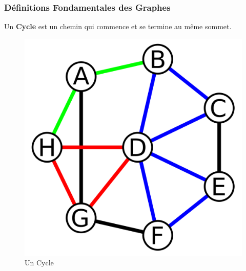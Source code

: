 \begin{frame}
\frametitle{Définitions Fondamentales des Graphes}

\begin{tcolorbox}[colback=orange!10,colframe=orange!100!black,
    title=Un Cycle]
    Un \textbf{Cycle} est un chemin qui commence et se termine au même sommet.
\end{tcolorbox}

\begin{figure}[H]
    \centering
    \includegraphics[width=0.5 \textwidth]{Figures/cycle.png}
    \caption{Un Cycle}
    \label{fig:Un Cycle}
\end{figure}

\end{frame}
